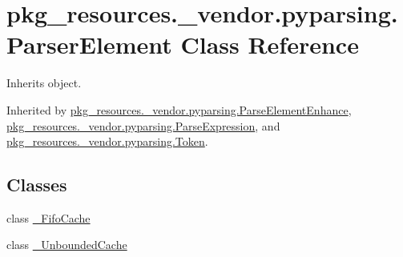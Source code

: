 \hypertarget{classpkg__resources_1_1__vendor_1_1pyparsing_1_1_parser_element}{}\section{pkg\+\_\+resources.\+\_\+vendor.\+pyparsing.\+Parser\+Element Class Reference}
\label{classpkg__resources_1_1__vendor_1_1pyparsing_1_1_parser_element}


Inherits object.



Inherited by \hyperlink{classpkg__resources_1_1__vendor_1_1pyparsing_1_1_parse_element_enhance}{pkg\+\_\+resources.\+\_\+vendor.\+pyparsing.\+Parse\+Element\+Enhance}, \hyperlink{classpkg__resources_1_1__vendor_1_1pyparsing_1_1_parse_expression}{pkg\+\_\+resources.\+\_\+vendor.\+pyparsing.\+Parse\+Expression}, and \hyperlink{classpkg__resources_1_1__vendor_1_1pyparsing_1_1_token}{pkg\+\_\+resources.\+\_\+vendor.\+pyparsing.\+Token}.

\subsection*{Classes}
\begin{DoxyCompactItemize}
\item 
class \hyperlink{classpkg__resources_1_1__vendor_1_1pyparsing_1_1_parser_element_1_1___fifo_cache}{\+\_\+\+Fifo\+Cache}
\item 
class \hyperlink{classpkg__resources_1_1__vendor_1_1pyparsing_1_1_parser_element_1_1___unbounded_cache}{\+\_\+\+Unbounded\+Cache}
\end{DoxyCompactItemize}
